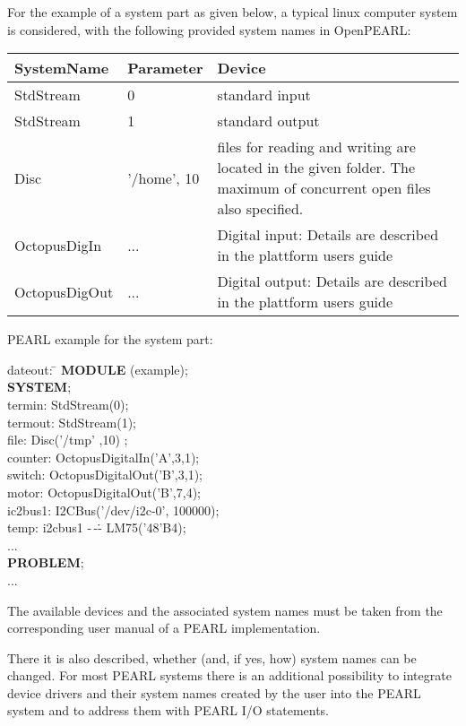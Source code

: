 \begin{accepted}

For the example of a system part as given below, a typical linux computer
system is considered, with the following provided system names in OpenPEARL:

\begin{tabular}{ll@{\x}p{6cm}}
SystemName & Parameter & Device \\ \hline
StdStream  &  0 & standard input \\
StdStream  &  1 & standard output \\
Disc       & '/home', 10 & files for reading and writing are located in the given folder. The maximum of concurrent open files also specified. \\
OctopusDigIn & ... & Digital input: Details are described in 
		the plattform users guide \\
OctopusDigOut & ... & Digital output: Details are described in 
		the plattform users guide \\
\end{tabular}

PEARL example for the system part:

\begin{tabbing}
\x dateout: \= \kill
{\bf MODULE} (example); \> \\
{\bf SYSTEM}; \> \\
\x termin:  \> StdStream(0); \\
\x termout: \> StdStream(1);\\
\x file:    \> Disc('/tmp' ,10) ;  \\
\x counter: \> OctopusDigitalIn('A',3,1); \\
\x switch:  \> OctopusDigitalOut('B',3,1); \\
\x motor:   \> OctopusDigitalOut('B',7,4); \\
\x ic2bus1: \> I2CBus('/dev/i2c-0', 100000);\\
\x temp:    \> i2cbus1 -\,-\.- LM75('48'B4); \\
\x ... \> \\
{\bf PROBLEM};\> \\
\x ... \>
\end{tabbing}

\end{accepted}

The available devices and the associated system names must be taken from
the corresponding user manual of a PEARL implementation.
\begin{removed} There it is
also described, whether (and, if yes, how) system names can be changed.
For most PEARL systems there is an additional possibility to integrate
device drivers and their system names created by the user into the PEARL
system and to address them with PEARL I/O statements.
\end{removed} 

